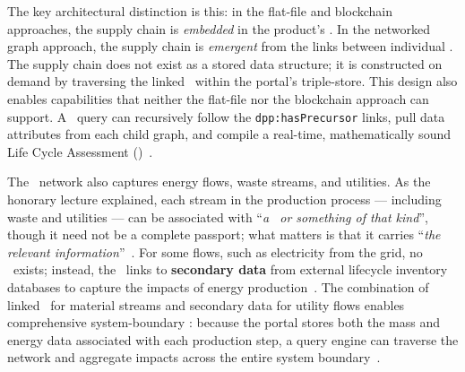The key architectural distinction is this: in the flat-file and blockchain
approaches, the supply chain is \textit{embedded} in the product's \DPP. In the
networked graph approach, the supply chain is \textit{emergent} from the links
between individual \DPPs. The supply chain does not exist as a stored data
structure; it is constructed on demand by traversing the linked \DPPs\ within
the portal's triple-store. This design also enables capabilities that neither
the flat-file nor the blockchain approach can support. A \SPARQL\ query can
recursively follow the \texttt{dpp:hasPrecursor} links, pull data attributes
from each child graph, and compile a real-time, mathematically sound Life Cycle
Assessment (\LCA)~\cite{dpp4eu2026_day2}.

The \DPP\ network also captures energy flows, waste streams, and utilities. As
the honorary lecture explained, each stream in the production process ---
including waste and utilities --- can be associated with ``\textit{a \DPP\ or
something of that kind}'', though it need not be a complete passport; what
matters is that it carries ``\textit{the relevant
information}''~\cite{dpp4eu2026_day2}. For some flows, such as electricity from
the grid, no \DPP\ exists; instead, the \LCA\ links to \textbf{secondary data}
from external lifecycle inventory databases to capture the impacts of energy
production~\cite{dpp4eu2026_day2}. The combination of linked \DPPs\ for material
streams and secondary data for utility flows enables comprehensive
system-boundary \LCA: because the portal stores both the mass and energy data
associated with each production step, a query engine can traverse the network
and aggregate impacts across the entire system boundary~\cite{dpp4eu2026_day2}.




